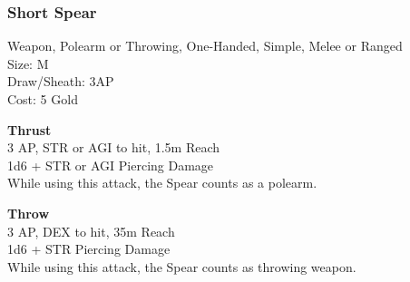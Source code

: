 \subsubsection{Short Spear}\label{weapon:shortSpear}
Weapon, Polearm or Throwing, One-Handed, Simple, Melee or Ranged\\
Size: M\\
Draw/Sheath: 3AP\\
Cost: 5 Gold

\textbf{Thrust}\\
3 AP, STR or AGI to hit, 1.5m Reach\\
1d6 + \texttimes STR or AGI Piercing Damage\\
While using this attack, the Spear counts as a polearm.

\textbf{Throw}\\
3 AP, DEX to hit, 35m Reach\\
1d6 + \texttimes STR Piercing Damage\\
While using this attack, the Spear counts as throwing weapon.

